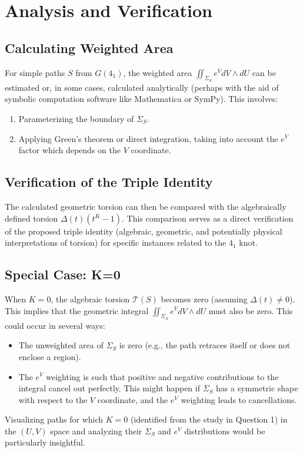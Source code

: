 \documentclass{article}
\begin{document}
\section{Analysis and Verification}

\subsection{Calculating Weighted Area}
For simple paths $S$ from $G(4_1)$, the weighted area $\iint_{\Sigma_S} e^V dV \wedge dU$ can be estimated or, in some cases, calculated analytically (perhaps with the aid of symbolic computation software like Mathematica or SymPy). This involves:
\begin{enumerate}
    \item Parameterizing the boundary of $\Sigma_S$.
    \item Applying Green's theorem or direct integration, taking into account the $e^V$ factor which depends on the $V$ coordinate.
\end{enumerate}

\subsection{Verification of the Triple Identity}
The calculated geometric torsion can then be compared with the algebraically defined torsion $\Delta(t)(t^K-1)$. This comparison serves as a direct verification of the proposed triple identity (algebraic, geometric, and potentially physical interpretations of torsion) for specific instances related to the $4_1$ knot.

\subsection{Special Case: K=0}
When $K=0$, the algebraic torsion $\mathcal{T}(S)$ becomes zero (assuming $\Delta(t) \neq 0$). This implies that the geometric integral $\iint_{\Sigma_S} e^V dV \wedge dU$ must also be zero. This could occur in several ways:
\begin{itemize}
    \item The unweighted area of $\Sigma_S$ is zero (e.g., the path retraces itself or does not enclose a region).
    \item The $e^V$ weighting is such that positive and negative contributions to the integral cancel out perfectly. This might happen if $\Sigma_S$ has a symmetric shape with respect to the $V$ coordinate, and the $e^V$ weighting leads to cancellations.
\end{itemize}
Visualizing paths for which $K=0$ (identified from the study in Question 1) in the $(U,V)$ space and analyzing their $\Sigma_S$ and $e^V$ distributions would be particularly insightful.
\end{document}
